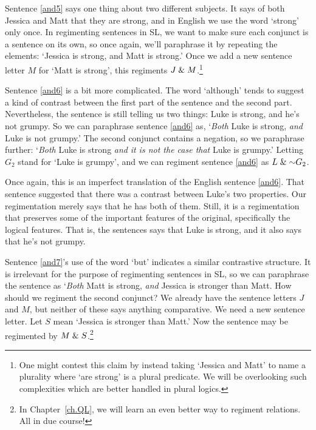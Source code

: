 Sentence \ref{and5} says one thing about two different subjects.
It says of both Jessica and Matt that they are strong, and in English we use the word `strong' only once.
In regimenting sentences in SL, we want to make sure each conjunct is a sentence on its own, so once again, we'll paraphrase it by repeating the elements: `Jessica is strong, and Matt is strong.'
Once we add a new sentence letter $M$ for `Matt is strong', this regiments $J\mathrel\& M$.\footnote{One might contest this claim by instead taking `Jessica and Matt' to name a plurality where `are strong' is a plural predicate. We will be overlooking such complexities which are better handled in plural logics.}

Sentence \ref{and6} is a bit more complicated.
The word `although' tends to suggest a kind of contrast between the first part of the sentence and the second part.
Nevertheless, the sentence is still telling us two things: Luke is strong, and he's not grumpy.
So we can paraphrase sentence \ref{and6} as, `\emph{Both} Luke is strong, \emph{and} Luke is not grumpy.'
The second conjunct contains a negation, so we paraphrase further: `\emph{Both} Luke is strong \emph{and} \emph{it is not the case that} Luke is grumpy.'
Letting $G_{2}$ stand for `Luke is grumpy', and we can regiment sentence \ref{and6} as $L\eand\enot G_{2}$.

Once again, this is an imperfect translation of the English sentence \ref{and6}.
That sentence suggested that there was a contrast between Luke's two properties.
Our regimentation merely says that he has both of them.
Still, it is a regimentation that preserves some of the important features of the original, specifically the logical features.
That is, the sentences says that Luke is strong, and it also says that he's not grumpy.

Sentence \ref{and7}'s use of the word `but' indicates a similar contrastive structure.
It is irrelevant for the purpose of regimenting sentences in SL, so we can paraphrase the sentence as `\emph{Both} Matt is strong, \emph{and} Jessica is stronger than Matt.
How should we regiment the second conjunct? 
We already have the sentence letters $J$ and $M$, but neither of these says anything comparative.
We need a new sentence letter.
Let $S$ mean `Jessica is stronger than Matt.'
Now the sentence may be regimented by $M \mathrel\& S$.\footnote{In Chapter~\ref{ch.QL}, we will learn an even better way to regiment relations. All in due course!}



